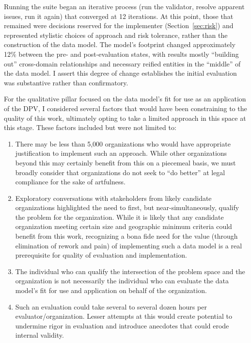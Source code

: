 \documentclass[10pt,letterpaper,twocolumn,twoside]{rho-class/rho}
\begin{document}
Running the suite began an iterative process (run the validator, resolve apparent issues, run it again) that converged at 12 iterations. At this point, those that remained were decisions reserved for the implementer (Section~\ref{sec:risk}) and represented stylistic choices of approach and risk tolerance, rather than the construction of the data model. The model's footprint changed approximately 12\% between the pre- and post-evaluation states, with results mostly ``building out'' cross-domain relationships and necessary reified entities in the ``middle'' of the data model. I assert this degree of change establishes the initial evaluation was substantive rather than confirmatory.

For the qualitative pillar focused on the data model's fit for use as an application of the DPV, I considered several factors that would have been constraining to the quality of this work, ultimately opting to take a limited approach in this space at this stage. These factors included but were not limited to:

\begin{enumerate}
    \item There may be less than 5,000 organizations who would have appropriate justification to implement such an approach. While other organizations beyond this may certainly benefit from this on a piecemeal basis, we must broadly consider that organizations do not seek to ``do better'' at legal compliance for the sake of artfulness.
    \item Exploratory conversations with stakeholders from likely candidate organizations highlighted the need to first, but near-simultaneously, qualify the problem for the organization. While it is likely that any candidate organization meeting certain size and geographic minimum criteria could benefit from this work, recognizing a bona fide need for the value (through elimination of rework and pain) of implementing such a data model is a real prerequisite for quality of evaluation and implementation.
    \item The individual who can qualify the intersection of the problem space and the organization is not necessarily the individual who can evaluate the data model's fit for use and application on behalf of the organization.
    \item Such an evaluation could take several to several dozen hours per evaluator/organization. Lesser attempts at this would create potential to undermine rigor in evaluation and introduce anecdotes that could erode internal validity.
\end{enumerate}
\end{document}
